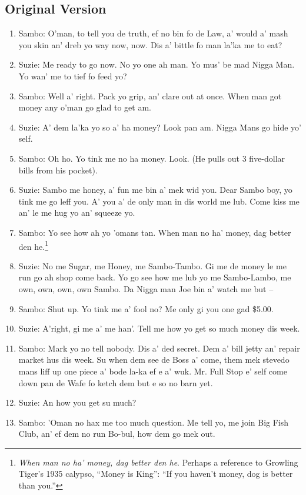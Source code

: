 \documentclass[output=paper,colorlinks,citecolor=brown]{langscibook}
\begin{document}
\subsection*{Original Version}
\begin{enumerate}[nosep]
    \item Sambo:  O’man, to tell you de truth, ef no bin fo de Law, a’ would a’ mash you skin an’ dreb yo way now, now. Dis a’ bittle fo man la’ka me to eat?
    \item Suzie:	Me ready to go now. No yo one ah man. Yo mus’ be mad Nigga Man. Yo wan’ me to tief fo feed yo?
    \item Sambo:  Well a’ right. Pack yo grip, an’ clare out at once. When man got money any o’man go glad to get am.
    \item Suzie:	A’ dem la’ka yo so a’ ha money? Look pan am. Nigga Mans go hide yo’ self.
    \item Sambo:  Oh ho. Yo tink me no ha money. Look. (He pulls out 3 five-dollar bills from his pocket).
    \item Suzie:	Sambo me honey, a’ fun me bin a’ mek wid you. Dear Sambo boy, yo tink me go leff you. A’ you a’ de only man in dis world me lub. Come kiss me an’ le me hug yo an’ squeeze yo.
    \item Sambo:   Yo see how ah yo ’omans tan. When man no ha’ money, dag better den he.\footnote{\textit{When man no ha’ money, dag better den he}. Perhaps a reference to Growling Tiger’s 1935 calypso, “Money is King”: “If you haven’t money, dog is better than you.”}
    \item Suzie:	No me Sugar, me Honey, me Sambo-Tambo.  Gi me de money le me run go ah shop come back. Yo go see how me lub yo me Sambo-Lambo, me own, own, own, own Sambo. Da Nigga man Joe bin a’ watch me but –
    \item Sambo:  Shut up. Yo tink me a’ fool no? Me only gi you one gad \$5.00.
    \item  Suzie:	A’right, gi me a’ me han’. Tell me how yo get so much money dis week.
    \item  Sambo:  Mark yo no tell nobody. Dis a’ ded secret. Dem a’ bill jetty an’ repair market hus dis week. Su when dem see de Boss a’ come, them mek stevedo mans liff up one piece a’ bode la-ka ef e a’ wuk. Mr. Full Stop e’ self come down pan de Wafe fo ketch dem but e so no barn yet.
    \item  Suzie:	An how you get su much?
    \item  Sambo:  ’Oman no hax me too much question. Me tell yo, me join Big Fish Club, an’ ef dem no run Bo-bul, how dem go mek out.

\end{enumerate}
\end{document}
